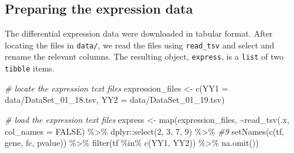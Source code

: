 \documentclass[9pt,a4paper,]{extarticle}
\newenvironment{Shaded}{\begin{snugshade}}{\end{snugshade}}
\newcommand{\AttributeTok}[1]{\textcolor[rgb]{0.77,0.63,0.00}{#1}}
\newcommand{\CommentTok}[1]{\textcolor[rgb]{0.56,0.35,0.01}{\textit{#1}}}
\newcommand{\ConstantTok}[1]{\textcolor[rgb]{0.00,0.00,0.00}{#1}}
\newcommand{\DecValTok}[1]{\textcolor[rgb]{0.00,0.00,0.81}{#1}}
\newcommand{\FunctionTok}[1]{\textcolor[rgb]{0.00,0.00,0.00}{#1}}
\newcommand{\NormalTok}[1]{#1}
\newcommand{\OtherTok}[1]{\textcolor[rgb]{0.56,0.35,0.01}{#1}}
\newcommand{\SpecialCharTok}[1]{\textcolor[rgb]{0.00,0.00,0.00}{#1}}
\newcommand{\StringTok}[1]{\textcolor[rgb]{0.31,0.60,0.02}{#1}}
\begin{document}
\hypertarget{preparing-the-expression-data}{%
\subsection{Preparing the expression data}\label{preparing-the-expression-data}}

The differential expression data were downloaded in tabular format. After locating the files in \texttt{data/}, we read the files using \texttt{read\_tsv} and select and rename the relevant columns. The resulting object, \texttt{express}, is a \texttt{list} of two \texttt{tibble} items.

\begin{Shaded}
\begin{Highlighting}[]
\CommentTok{\# locate the expression text files}
\NormalTok{expression\_files }\OtherTok{\textless{}{-}} \FunctionTok{c}\NormalTok{(}\AttributeTok{YY1 =} \StringTok{\textquotesingle{}data/DataSet\_01\_18.tsv\textquotesingle{}}\NormalTok{,}
                      \AttributeTok{YY2 =} \StringTok{\textquotesingle{}data/DataSet\_01\_19.tsv\textquotesingle{}}\NormalTok{)}

\CommentTok{\# load the expression text files}
\NormalTok{express }\OtherTok{\textless{}{-}} \FunctionTok{map}\NormalTok{(expression\_files,}
               \SpecialCharTok{\textasciitilde{}}\FunctionTok{read\_tsv}\NormalTok{(.x, }\AttributeTok{col\_names =} \ConstantTok{FALSE}\NormalTok{) }\SpecialCharTok{\%\textgreater{}\%}
\NormalTok{                 dplyr}\SpecialCharTok{::}\FunctionTok{select}\NormalTok{(}\DecValTok{2}\NormalTok{, }\DecValTok{3}\NormalTok{, }\DecValTok{7}\NormalTok{, }\DecValTok{9}\NormalTok{) }\SpecialCharTok{\%\textgreater{}\%} \CommentTok{\#9}
                 \FunctionTok{setNames}\NormalTok{(}\FunctionTok{c}\NormalTok{(}\StringTok{\textquotesingle{}tf\textquotesingle{}}\NormalTok{, }\StringTok{\textquotesingle{}gene\textquotesingle{}}\NormalTok{, }\StringTok{\textquotesingle{}fc\textquotesingle{}}\NormalTok{, }\StringTok{\textquotesingle{}pvalue\textquotesingle{}}\NormalTok{)) }\SpecialCharTok{\%\textgreater{}\%}
                 \FunctionTok{filter}\NormalTok{(tf }\SpecialCharTok{\%in\%} \FunctionTok{c}\NormalTok{(}\StringTok{\textquotesingle{}YY1\textquotesingle{}}\NormalTok{, }\StringTok{\textquotesingle{}YY2\textquotesingle{}}\NormalTok{)) }\SpecialCharTok{\%\textgreater{}\%}
                 \FunctionTok{na.omit}\NormalTok{())}
\end{Highlighting}
\end{Shaded}
\end{document}
